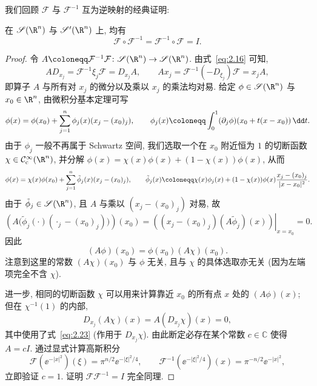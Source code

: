 我们回顾 $\mathcal{F}$ 与 $\mathcal{F}^{-1}$ 互为逆映射的经典证明:

\begin{theorem}\label{thm:2.8}
在 $\Schwartz(\R^n)$ 与 $\TempDistr(\R^n)$ 上, 均有
\[
    \mathcal{F} \circ \mathcal{F}^{-1} = \mathcal{F}^{-1} \circ \mathcal{F} = I.
\]
\end{theorem}

\begin{proof}
令 $A \defeq \mathcal{F}^{-1} \mathcal{F} \colon \Schwartz(\R^n) \to \Schwartz(\R^n)$. 由式~\eqref{eq:2.16} 可知,
\[
    A D_{x_j} = \mathcal{F}^{-1} \xi_j \mathcal{F} = D_{x_j} A, \qquad A x_j = \mathcal{F}^{-1} (-D_{\xi_j}) \mathcal{F} = x_j A,
\]
即算子 $A$ 与所有对 $x_j$ 的微分以及乘以 $x_j$ 的乘法均对易. 给定 $\phi \in \Schwartz(\R^n)$ 与 $x_0 \in \R^n$, 由微积分基本定理可写
\begin{equation}\label{eq:2.21}
    \phi(x) = \phi(x_0) + \sum_{j=1}^n \phi_j(x) (x_j - (x_0)_j), \qquad \phi_j(x) \defeq \int_0^1 (\partial_j \phi)(x_0 + t(x - x_0)) \,\dd t.
\end{equation}
由于 $\phi_j$ 一般不再属于 Schwartz 空间, 我们选取一个在 $x_0$ 附近恒为 $1$ 的切断函数 $\chi \in \SmoothComp(\R^n)$, 并分解 $\phi(x) = \chi(x) \phi(x) + (1 - \chi(x)) \phi(x)$, 从而
\begin{equation}\label{eq:2.22}
    \phi(x) = \chi(x) \phi(x_0) + \sum_{j=1}^n \tilde{\phi}_j(x) (x_j - (x_0)_j), \qquad \tilde{\phi}_j(x) \defeq \chi(x) \phi_j(x) + (1 - \chi(x)) \phi(x) \frac{x_j - (x_0)_j}{|x - x_0|^2}.
\end{equation}
由于 $\tilde{\phi}_j \in \Schwartz(\R^n)$, 且 $A$ 与乘以 $(x_j - (x_0)_j)$ 对易, 故
\[
    \left( A\bigl(\tilde{\phi}_j(\cdot)(\cdot_j - (x_0)_j)\bigr) \right)(x_0) = \left. \left( (x_j - (x_0)_j) (A \tilde{\phi}_j)(x) \right) \right|_{x = x_0} = 0.
\]
因此
\begin{equation}\label{eq:2.23}
    (A \phi)(x_0) = \phi(x_0) (A \chi)(x_0).
\end{equation}
注意到这里的常数 $(A \chi)(x_0)$ 与 $\phi$ 无关, 且与 $\chi$ 的具体选取亦无关 (因为左端项完全不含 $\chi$).

进一步, 相同的切断函数 $\chi$ 可以用来计算靠近 $x_0$ 的所有点 $x$ 处的 $(A \phi)(x)$; 但在 $\chi^{-1}(1)$ 的内部,
\begin{equation}\label{eq:2.24}
    D_{x_j} (A \chi)(x) = A(D_{x_j} \chi)(x) = 0,
\end{equation}
其中使用了式~\eqref{eq:2.23} (作用于 $D_{x_j} \chi$). 由此断定必存在某个常数 $c \in \mathbb{C}$ 使得 $A = c I$. 通过显式计算高斯积分
\begin{equation}\label{eq:2.25}
    \mathcal{F}(\ee^{-|x|^2})(\xi) = \pi^{n/2} \ee^{-|\xi|^2/4}, \qquad \mathcal{F}^{-1}(\ee^{-|\xi|^2/4})(x) = \pi^{-n/2} \ee^{-|x|^2},
\end{equation}
立即验证 $c = 1$. 证明 $\mathcal{F} \mathcal{F}^{-1} = I$ 完全同理.
\end{proof}

